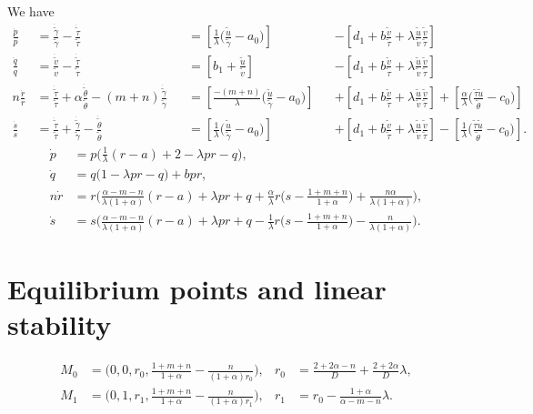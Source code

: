 \documentclass[a4paper,11pt]{article}
\def\tg{{\tilde{\gamma}}}
\def\tv{{\tilde{v}}}
\def\tth{{\tilde{\theta}}}
\def\ts{{\tilde{\tau}}}
\def\tu{{\tilde{u}}}
\def\dtg{\dot{\tilde{\gamma}}}
\def\dtv{\dot{\tilde{v}}}
\def\dtth{\dot{\tilde{\theta}}}
\def\dts{\dot{\tilde{\tau}}}
\def\dpp{\dot{p}}
\def\dqq{\dot{q}}
\def\drr{\dot{r}}
\begin{document}
We have
\begin{align*}
 \frac{\dpp}{p}&=\frac{\dtg}{\tg} - \frac{\dts}{\ts}& &=\left[\frac{1}{\lambda }\Big(\frac{\tu}{\tg}-a_0\Big)\right] & &-\left[d_1 + b\frac{\tv}{\ts} + \lambda\frac{\tu}{\tv}\frac{\tv}{\ts}\right]\\
 \frac{\dqq}{q}&=\frac{\dtv}{\tv} - \frac{\dts}{\ts}& &=\left[b_1 +\frac{\tu}{\tv}\right] & &-\left[d_1 + b\frac{\tv}{\ts} + \lambda\frac{\tu}{\tv}\frac{\tv}{\ts}\right]\\
 n\frac{\drr}{r}&=\frac{\dts}{\ts} + \alpha\frac{\dtth}{\tth} -(m+n)\frac{\dtg}{\tg}& &=\left[\frac{-(m+n)}{\lambda}\Big(\frac{\tu}{\tg}-a_0\Big)\right]& &+\left[d_1 + b\frac{\tv}{\ts} + \lambda\frac{\tu}{\tv}\frac{\tv}{\ts}\right] + \left[\frac{\alpha}{\lambda }\Big(\frac{\ts\tu}{\tth}-c_0\Big)\right]\\
 \frac{\dot{s}}{s} &= \frac{\dts}{\ts} + \frac{\dtg}{\tg} - \frac{\dtth}{\tth} & &=\left[\frac{1}{\lambda }\Big(\frac{\tu}{\tg}-a_0\Big)\right] & &+\left[d_1 + b\frac{\tv}{\ts} + \lambda\frac{\tu}{\tv}\frac{\tv}{\ts}\right] -\left[\frac{1}{\lambda }\Big(\frac{\ts\tu}{\tth}-c_0\Big)\right].%
\end{align*}
\begin{equation}\label{eq:slow}
 \begin{aligned}
 \dot{p} &=p\Big(\frac{1}{\lambda}(r-a) + 2- \lambda p r -q\Big),\\
 \dot{q} &=q\Big(1 -\lambda p r -q\Big) + b p r,\\
 n\dot{r} &=r\Big(\frac{\alpha-m-n}{\lambda(1+\alpha)}(r-a) + \lambda pr + q +\frac{\alpha}{\lambda}r\big(s- \frac{1+m+n}{1+\alpha}\big) + \frac{n\alpha}{\lambda(1+\alpha)}\Big),\\
 \dot{s} &=s\Big(\frac{\alpha-m-n}{\lambda(1+\alpha)}(r-a) + \lambda pr + q - \frac{1}{\lambda}r\big(s- \frac{1+m+n}{1+\alpha}\big) - \frac{n}{\lambda(1+\alpha)}\Big).
 \end{aligned}
\end{equation}

\section{Equilibrium points and linear stability}

\begin{align*}
 M_0 &= \Big(0,0,r_0,\frac{1+m+n}{1+\alpha} - \frac{n}{(1+\alpha)r_0}\Big), & r_0 &=\frac{2+2\alpha-n}{D} + \frac{2+2\alpha}{D}\lambda,\\
 M_1 &= \Big(0,1,r_1,\frac{1+m+n}{1+\alpha} - \frac{n}{(1+\alpha)r_1}\Big), & r_1 &= r_0-\frac{1+\alpha}{\alpha-m-n}\lambda.
\end{align*}
\end{document}
